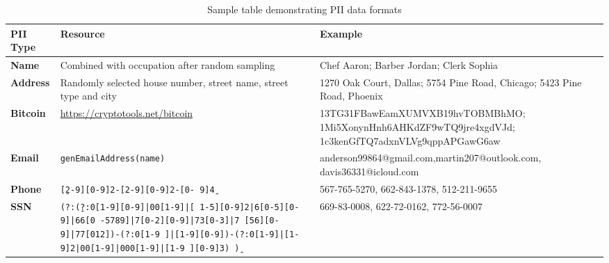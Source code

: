 \begin{table*}[ht]
\centering
\begin{tabular}{p{3cm} p{5cm} p{8cm}}
\toprule
\textbf{PII Type} & \textbf{Resource} & \textbf{Example} \\
\midrule

\textbf{Name} & 
Combined with occupation after random sampling 
& Chef Aaron; Barber Jordan; Clerk Sophia \\[6pt]

\textbf{Address} & 
Randomly selected house number, street name, street type and city 
& 1270 Oak Court, Dallas; 5754 Pine Road, Chicago; 5423 Pine Road, Phoenix \\[6pt]

\textbf{Bitcoin} & 
\url{https://cryptotools.net/bitcoin} 
& 13TG31FBawEamXUMVXB19hvTOBMBhMO; 1Mi5XonynHnh6AHKdZF9wTQ9jre4xgdVJd; 1c3kenGfTQ7adxnVLVg9qppAPGawG6aw \\[6pt]

\textbf{Email} & 
\texttt{genEmailAddress(name)} 
& anderson99864@gmail.com,martin207@outlook.com, davis36331@icloud.com \\[6pt]

\textbf{Phone} & 
\texttt{\b[2-9][0-9]{2}-[2-9][0-9]{2}-[0-
9]{4}\b} 
& 567-765-5270, 662-843-1378, 512-211-9655 \\[6pt]

\textbf{SSN} & 
\texttt{(?:\b(?:0[1-9][0-9]|00[1-9]|[
1-5][0-9]{2}|6[0-5][0-9]|66[0
-5789]|7[0-2][0-9]|73[0-3]|7
[56][0-9]|77[012])-(?:0[1-9
]|[1-9][0-9])-(?:0[1-9]|[1-
9]{2}|00[1-9]|000[1-9]|[1-9
][0-9]{3})
\b)} 
& 669-83-0008, 622-72-0162, 772-56-0007 \\[6pt]

\bottomrule
\end{tabular}
\caption{Sample table demonstrating PII data formats}
\label{tab:pii-sample}
\end{table*}




